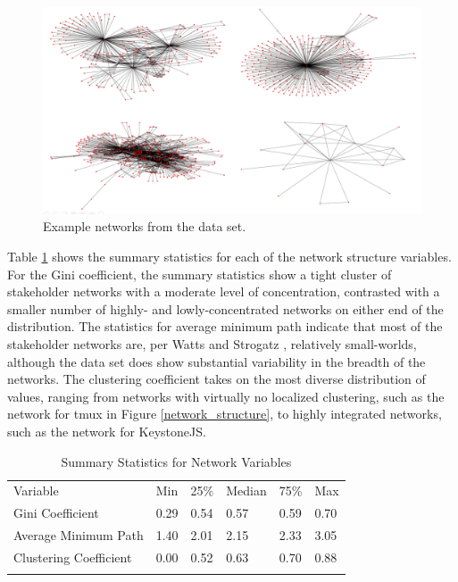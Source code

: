 \begin{figure}
  \includegraphics[width=.95\textwidth]{network_plots.PNG}
\caption{Example networks from the data set.}
\label{network_plots}
\end{figure}

Table \ref{network_summary} shows the summary statistics for each of the network structure variables. For the Gini coefficient, the summary statistics show a tight cluster of stakeholder networks with a moderate level of concentration, contrasted with a smaller number of highly- and lowly-concentrated networks on either end of the distribution. The statistics for average minimum path indicate that most of the stakeholder networks are, per Watts and Strogatz \cite{watts}, relatively small-worlds, although the data set does show substantial variability in the breadth of the networks. The clustering coefficient takes on the most diverse distribution of values, ranging from networks with virtually no localized clustering, such as the network for tmux in Figure \ref{network_structure}, to highly integrated networks, such as the network for KeystoneJS.

\begin{table}
\caption{Summary Statistics for Network Variables}
\label{network_summary}
\begin{tabular}{llllll}
\hline\noalign{\smallskip}
Variable & Min & 25\% & Median & 75\% & Max  \\
\noalign{\smallskip}\hline\noalign{\smallskip}
Gini Coefficient & 0.29 & 0.54 & 0.57 & 0.59 & 0.70 \\
Average Minimum Path & 1.40 & 2.01 & 2.15 & 2.33 & 3.05 \\
Clustering Coefficient & 0.00 & 0.52 & 0.63 & 0.70 & 0.88 \\
\noalign{\smallskip}\hline
\end{tabular}
\end{table}

